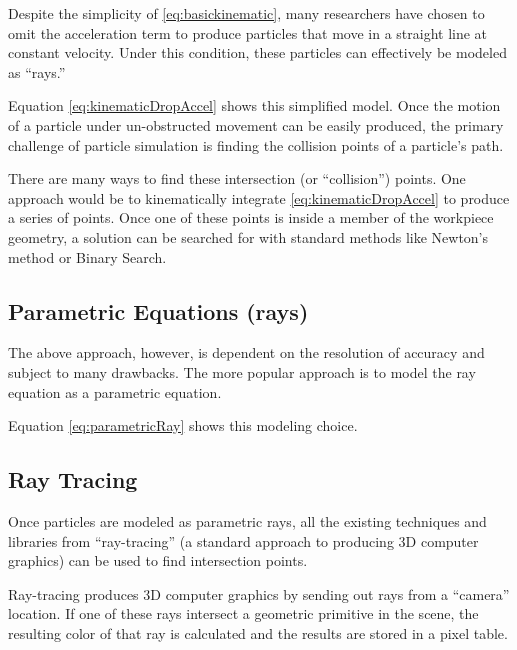 Despite the simplicity of \eqref{eq:basickinematic}, many researchers have chosen to omit the acceleration term to produce particles that move in a straight line at constant velocity. Under this condition, these particles can effectively be modeled as ``rays.''



Equation \eqref{eq:kinematicDropAccel} shows this simplified model. Once the motion of a particle under un-obstructed movement can be easily produced, the primary challenge of particle simulation is finding the collision points of a particle's path.

There are many ways to find these intersection (or ``collision'') points. One approach would be to kinematically integrate \eqref{eq:kinematicDropAccel} to produce a series of points. Once one of these points is inside a member of the workpiece geometry, a solution can be searched for with standard methods like Newton's method or Binary Search.

	\subsection{Parametric Equations (rays)}

The above approach, however, is dependent on the resolution of accuracy and subject to many drawbacks. The more popular approach is to model the ray equation as a parametric equation.

 {
	\label{eq:parametricRay}	
}

Equation \eqref{eq:parametricRay} shows this modeling choice.


	\subsection{Ray Tracing}

Once particles are modeled as parametric rays, all the existing techniques and libraries from ``ray-tracing'' (a standard approach to producing 3D computer graphics) can be used to find intersection points.

Ray-tracing produces 3D computer graphics by sending out rays from a ``camera'' location. If one of these rays intersect a geometric primitive in the scene, the resulting color of that ray is calculated and the results are stored in a pixel table.

